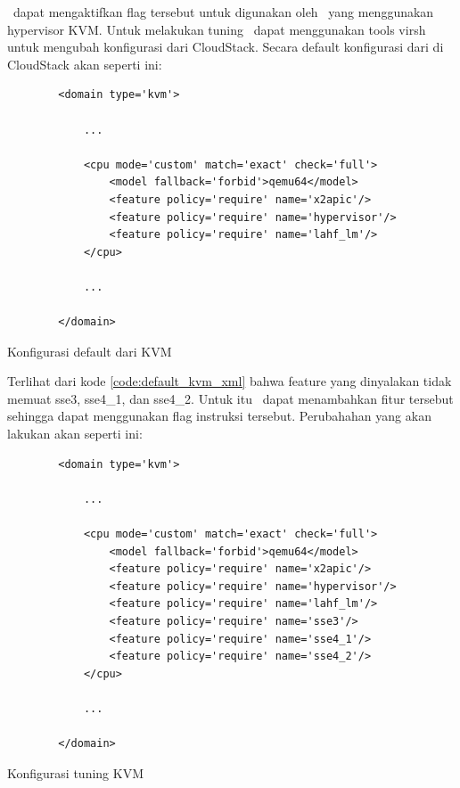 \saya\ dapat mengaktifkan flag tersebut untuk digunakan oleh \vm\ yang menggunakan hypervisor KVM. Untuk melakukan tuning \saya\ dapat menggunakan tools virsh untuk mengubah konfigurasi \vm dari CloudStack. Secara default konfigurasi dari \vm di CloudStack akan seperti ini:

\begin{listing}[H]
    \begin{verbatim}
        <domain type='kvm'>
        
            ...
            
            <cpu mode='custom' match='exact' check='full'>
                <model fallback='forbid'>qemu64</model>
                <feature policy='require' name='x2apic'/>
                <feature policy='require' name='hypervisor'/>
                <feature policy='require' name='lahf_lm'/>
            </cpu>
            
            ...
            
        </domain>
    \end{verbatim}
    \caption{Konfigurasi default dari KVM}
    \label{code:default_kvm_xml}
\end{listing}

Terlihat dari kode \ref{code:default_kvm_xml} bahwa feature yang dinyalakan tidak memuat sse3, sse4\_1, dan sse4\_2. Untuk itu \saya\ dapat menambahkan fitur tersebut sehingga \vm dapat menggunakan flag instruksi tersebut. Perubahahan yang akan \saya lakukan akan seperti ini:

\begin{listing}[H]
    \begin{verbatim}
        <domain type='kvm'>
        
            ...
            
            <cpu mode='custom' match='exact' check='full'>
                <model fallback='forbid'>qemu64</model>
                <feature policy='require' name='x2apic'/>
                <feature policy='require' name='hypervisor'/>
                <feature policy='require' name='lahf_lm'/>
                <feature policy='require' name='sse3'/>
                <feature policy='require' name='sse4_1'/>
                <feature policy='require' name='sse4_2'/>
            </cpu>
            
            ...
            
        </domain>
    \end{verbatim}
    \caption{Konfigurasi tuning KVM}
    \label{code:tuned_kvm_xml}
\end{listing}

